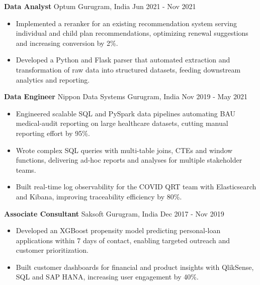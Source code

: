 \documentclass[10pt,a4paper]{article}
\newcommand{\role}[4]{\textbf{#1} \textbar{} #2 \hfill #3 \textbar{} #4\par}
\begin{document}
\vspace{3pt}
\role{Data Analyst}{Optum}{Gurugram, India}{Jun 2021 - Nov 2021}
\begin{itemize}
  \item Implemented a reranker for an existing recommendation system serving individual and child plan recommendations, optimizing renewal suggestions and increasing conversion by 2\%.
  \item Developed a Python and Flask parser that automated extraction and transformation of raw data into structured datasets, feeding downstream analytics and reporting.
\end{itemize}
\vspace{3pt}
\role{Data Engineer}{Nippon Data Systems}{Gurugram, India}{Nov 2019 - May 2021}
\begin{itemize}
  \item Engineered scalable SQL and PySpark data pipelines automating BAU medical-audit reporting on large healthcare datasets, cutting manual reporting effort by 95\%.
  \item Wrote complex SQL queries with multi-table joins, CTEs and window functions, delivering ad-hoc reports and analyses for multiple stakeholder teams.
  \item Built real-time log observability for the COVID QRT team with Elasticsearch and Kibana, improving traceability efficiency by 80\%.
\end{itemize}
\vspace{3pt}
\role{Associate Consultant}{Saksoft}{Gurugram, India}{Dec 2017 - Nov 2019}
\begin{itemize}
  \item Developed an XGBoost propensity model predicting personal-loan applications within 7 days of contact, enabling targeted outreach and customer prioritization.
  \item Built customer dashboards for financial and product insights with QlikSense, SQL and SAP HANA, increasing user engagement by 40\%.
\end{itemize}
\end{document}
